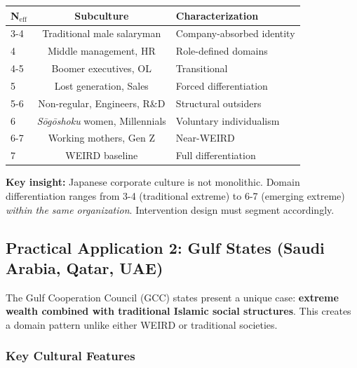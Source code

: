 \begin{center}
\begin{tabular}{@{}lcl@{}}
\toprule
\textbf{N$_{\text{eff}}$} & \textbf{Subculture} & \textbf{Characterization} \\
\midrule
3-4 & Traditional male salaryman & Company-absorbed identity \\
4 & Middle management, HR & Role-defined domains \\
4-5 & Boomer executives, OL & Transitional \\
5 & Lost generation, Sales & Forced differentiation \\
5-6 & Non-regular, Engineers, R\&D & Structural outsiders \\
6 & \textit{Sōgōshoku} women, Millennials & Voluntary individualism \\
6-7 & Working mothers, Gen Z & Near-WEIRD \\
\midrule
7 & WEIRD baseline & Full differentiation \\
\bottomrule
\end{tabular}
\end{center}

\textbf{Key insight:} Japanese corporate culture is not monolithic. Domain differentiation ranges from 3-4 (traditional extreme) to 6-7 (emerging extreme) \textit{within the same organization}. Intervention design must segment accordingly.


\subsection{Practical Application 2: Gulf States (Saudi Arabia, Qatar, UAE)}
\label{sec:bj-gulf}

The Gulf Cooperation Council (GCC) states present a unique case: \textbf{extreme wealth combined with traditional Islamic social structures}. This creates a domain pattern unlike either WEIRD or traditional societies.

\subsubsection{Key Cultural Features}

